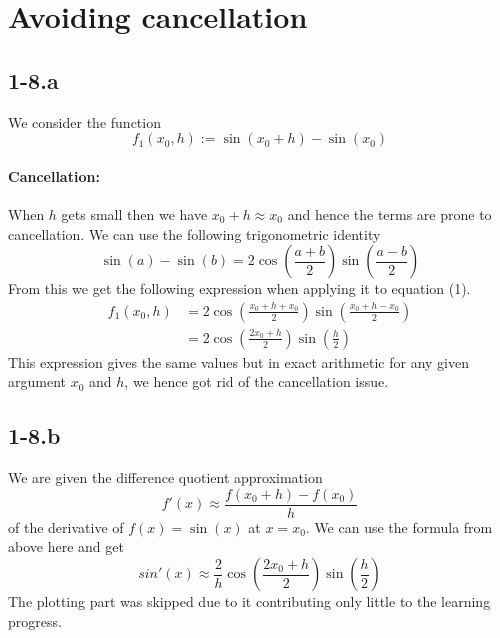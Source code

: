 \documentclass{article}
\begin{document}
\section*{Avoiding cancellation}
\subsection*{1-8.a} We consider the function
\begin{equation}
    f_{1}\left(x_{0}, h\right) := \sin\left(x_{0} + h\right) - \sin\left(x_{0}\right)
\end{equation}
\paragraph{Cancellation: } When $h$ gets small then we have $x_{0} + h \approx x_{0}$ and hence the terms are prone to cancellation. We can use the following trigonometric identity
\begin{equation*}
    \sin\left(a\right)  - \sin\left(b\right) = 2 \cos\left(\frac{a +b}{2}\right) \sin\left(\frac{a-b}{2}\right)
\end{equation*}
From this we get the following expression when applying it to equation (1). 
\begin{align*}
    f_{1}\left(x_{0}, h\right) &= 2\cos\left( \frac{x_{0} + h + x_{0}}{2}\right)\sin\left(\frac{x_{0}+h-x_{0}}{2}\right)\\
    &=  2\cos\left( \frac{2x_{0} + h}{2}\right)\sin\left(\frac{h}{2}\right)
\end{align*}
This expression gives the same values but in exact arithmetic for any given argument $x_{0}$ and $h$, we hence got rid of the cancellation issue.

\subsection*{1-8.b}
We are given the difference quotient approximation
\begin{equation*}
    f'\left(x\right) \approx \frac{f\left(x_{0}+h\right) - f\left(x_{0}\right)}{h}
\end{equation*}
of the derivative of $f\left(x\right) = \sin\left(x\right)$ at $x = x_{0}$. We can use the formula from above here and get
\begin{equation*}
    sin'\left(x\right) \approx \frac{2}{h}\cos\left( \frac{2x_{0} + h}{2}\right)\sin\left(\frac{h}{2}\right)
\end{equation*}
The plotting part was skipped due to it contributing only little to the learning progress.
\end{document}

